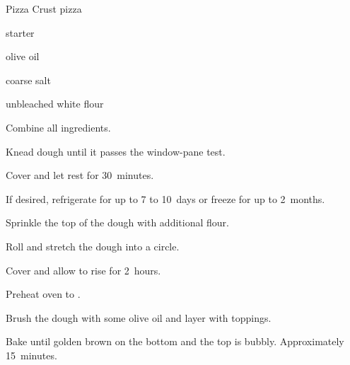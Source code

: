 \begin{recipe}{Pizza Crust}{}{ pizza}

\begin{ingredients}
\item {} starter
\item {} olive oil
\item {} coarse salt
\item {} unbleached white flour
\end{ingredients}

\begin{directions}
\item Combine all ingredients.
\item Knead dough until it passes the window-pane test.
\item Cover and let rest for 30~minutes.
\item If desired, refrigerate for up to 7 to 10~days or freeze for up to 2~months.
\item Sprinkle the top of the dough with additional flour.
\item Roll and stretch the dough into a circle.
\item Cover and allow to rise for 2~hours.
\item Preheat oven to .
\item Brush the dough with some olive oil and layer with toppings.
\item Bake until golden brown on the bottom and the top is bubbly. Approximately 15~minutes.
\end{directions}
\end{recipe}
